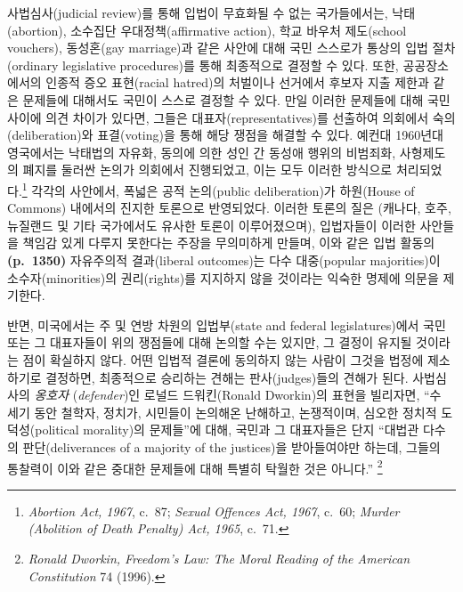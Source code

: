 \documentclass[a4paper,12pt,oneside]{article}  %
\newcommand{\emphksans}[1]{%
  {\kopubhangul\kopublatin\textsl{#1}}%
}
\begin{document}
사법심사(judicial review)를 통해 입법이 무효화될 수 없는 국가들에서는,
낙태(abortion), 소수집단 우대정책(affirmative action), 학교 바우처
제도(school vouchers), 동성혼(gay marriage)과 같은 사안에 대해 국민
스스로가 통상의 입법 절차(ordinary legislative procedures)를 통해
최종적으로 결정할 수 있다. 또한, 공공장소에서의 인종적 증오 표현(racial
hatred)의 처벌이나 선거에서 후보자 지출 제한과 같은 문제들에 대해서도
국민이 스스로 결정할 수 있다. 만일 이러한 문제들에 대해 국민 사이에 의견
차이가 있다면, 그들은 대표자(representatives)를 선출하여 의회에서
숙의(deliberation)와 표결(voting)을 통해 해당 쟁점을 해결할 수 있다.
예컨대 1960년대 영국에서는 낙태법의 자유화, 동의에 의한 성인 간 동성애
행위의 비범죄화, 사형제도의 폐지를 둘러싼 논의가 의회에서 진행되었고,
이는 모두 이러한 방식으로 처리되었다.\footnote{\emph{Abortion Act,
  1967}, c.~87; \emph{Sexual Offences Act, 1967}, c.~60; \emph{Murder
  (Abolition of Death Penalty) Act, 1965}, c.~71.} 각각의 사안에서,
폭넓은 공적 논의(public deliberation)가 하원(House of Commons) 내에서의
진지한 토론으로 반영되었다. 이러한 토론의 질은 (캐나다, 호주, 뉴질랜드
및 기타 국가에서도 유사한 토론이 이루어졌으며), 입법자들이 이러한
사안들을 책임감 있게 다루지 못한다는 주장을 무의미하게 만들며, 이와 같은
입법 활동의 \textbf{(p.~1350)} 자유주의적 결과(liberal outcomes)는 다수
대중(popular majorities)이 소수자(minorities)의 권리(rights)를 지지하지
않을 것이라는 익숙한 명제에 의문을 제기한다.

반면, 미국에서는 주 및 연방 차원의 입법부(state and federal
legislatures)에서 국민 또는 그 대표자들이 위의 쟁점들에 대해 논의할 수는
있지만, 그 결정이 유지될 것이라는 점이 확실하지 않다. 어떤 입법적 결론에
동의하지 않는 사람이 그것을 법정에 제소하기로 결정하면, 최종적으로
승리하는 견해는 판사(judges)들의 견해가 된다. 사법심사의
\emphksans{옹호자}(\emph{defender})인 로널드 드워킨(Ronald Dworkin)의 표현을
빌리자면, ``수 세기 동안 철학자, 정치가, 시민들이 논의해온 난해하고,
논쟁적이며, 심오한 정치적 도덕성(political morality)의 문제들''에 대해,
국민과 그 대표자들은 단지 ``대법관 다수의 판단(deliverances of a
majority of the justices)을 받아들여야만 하는데, 그들의 통찰력이 이와
같은 중대한 문제들에 대해 특별히 탁월한 것은 아니다.'' \footnote{\emph{Ronald
  Dworkin, Freedom's Law: The Moral Reading of the American
  Constitution} 74 (1996).}
\end{document}
